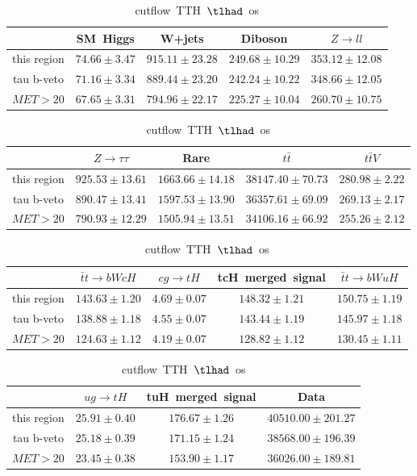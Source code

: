 \begin{table}
\caption{cutflow~TTH~$\tlhad$~os}
\centering
\begin{tabular}{|c|c|c|c|c|} \hline
 & SM~Higgs & W+jets & Diboson & $Z\to ll$\\\hline
this region & $74.66\pm3.47$ & $915.11\pm23.28$ & $249.68\pm10.29$ & $353.12\pm12.08$\\\hline
tau b-veto & $71.16\pm3.34$ & $889.44\pm23.20$ & $242.24\pm10.22$ & $348.66\pm12.05$\\\hline
$MET>20$ & $67.65\pm3.31$ & $794.96\pm22.17$ & $225.27\pm10.04$ & $260.70\pm10.75$\\\hline
\end{tabular}
\begin{tabular}{|c|c|c|c|c|} \hline
 & $Z\to \tau\tau$ & Rare & $t\bar{t}$ & $t\bar{t}V$\\\hline
this region & $925.53\pm13.61$ & $1663.66\pm14.18$ & $38147.40\pm70.73$ & $280.98\pm2.22$\\\hline
tau b-veto & $890.47\pm13.41$ & $1597.53\pm13.90$ & $36357.61\pm69.09$ & $269.13\pm2.17$\\\hline
$MET>20$ & $790.93\pm12.29$ & $1505.94\pm13.51$ & $34106.16\pm66.92$ & $255.26\pm2.12$\\\hline
\end{tabular}
\begin{tabular}{|c|c|c|c|c|} \hline
 & $\bar{t}t\to bWcH$ & $cg\to tH$ & tcH~merged~signal & $\bar{t}t\to bWuH$\\\hline
this region & $143.63\pm1.20$ & $4.69\pm0.07$ & $148.32\pm1.21$ & $150.75\pm1.19$\\\hline
tau b-veto & $138.88\pm1.18$ & $4.55\pm0.07$ & $143.44\pm1.19$ & $145.97\pm1.18$\\\hline
$MET>20$ & $124.63\pm1.12$ & $4.19\pm0.07$ & $128.82\pm1.12$ & $130.45\pm1.11$\\\hline
\end{tabular}
\begin{tabular}{|c|c|c|c|} \hline
 & $ug\to tH$ & tuH~merged~signal & Data\\\hline
this region & $25.91\pm0.40$ & $176.67\pm1.26$ & $40510.00\pm201.27$\\\hline
tau b-veto & $25.18\pm0.39$ & $171.15\pm1.24$ & $38568.00\pm196.39$\\\hline
$MET>20$ & $23.45\pm0.38$ & $153.90\pm1.17$ & $36026.00\pm189.81$\\\hline
\end{tabular}
\label{tab:cutflow_reg1l1tau1b3j_os}
\end{table}
